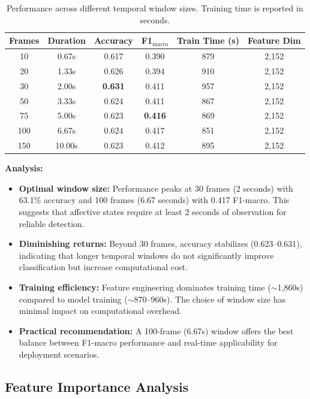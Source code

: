 \begin{table}[t]
\centering
\caption{Performance across different temporal window sizes. Training time is reported in seconds.}
\label{tab:frame-count-results}
\begin{tabular}{cccccc}
\toprule
\textbf{Frames} & \textbf{Duration} & \textbf{Accuracy} & \textbf{F1$_{\text{macro}}$} & \textbf{Train Time (s)} & \textbf{Feature Dim} \\
\midrule
10 & 0.67s & 0.617 & 0.390 & 879 & 2,152 \\
20 & 1.33s & 0.626 & 0.394 & 910 & 2,152 \\
30 & 2.00s & \textbf{0.631} & 0.411 & 957 & 2,152 \\
50 & 3.33s & 0.624 & 0.411 & 867 & 2,152 \\
75 & 5.00s & 0.623 & \textbf{0.416} & 869 & 2,152 \\
100 & 6.67s & 0.624 & 0.417 & 851 & 2,152 \\
150 & 10.00s & 0.623 & 0.412 & 895 & 2,152 \\
\bottomrule
\end{tabular}
\end{table}

\textbf{Analysis:}
\begin{itemize}
    \item \textbf{Optimal window size:} Performance peaks at 30 frames (2 seconds) with 63.1\% accuracy and 100 frames (6.67 seconds) with 0.417 F1-macro. This suggests that affective states require at least 2 seconds of observation for reliable detection.
    
    \item \textbf{Diminishing returns:} Beyond 30 frames, accuracy stabilizes (0.623--0.631), indicating that longer temporal windows do not significantly improve classification but increase computational cost.
    
    \item \textbf{Training efficiency:} Feature engineering dominates training time ($\sim$1,860s) compared to model training ($\sim$870--960s). The choice of window size has minimal impact on computational overhead.
    
    \item \textbf{Practical recommendation:} A 100-frame (6.67s) window offers the best balance between F1-macro performance and real-time applicability for deployment scenarios.
\end{itemize}

\subsection{Feature Importance Analysis}
\label{subsec:feature-importance}

